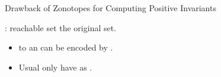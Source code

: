 

\begin{frame}{Drawback of Zonotopes for Computing Positive Invariants}
%
\begin{minipage}{0.48\textwidth}
:  reachable set  the original set.
%
{\small
\begin{itemize}
\item {} to an  can be
encoded by .
\item Usual  only have
 as .
\end{itemize}
}
%
\end{minipage}
%
\begin{minipage}{0.48\textwidth}


\end{minipage}
\end{frame}

